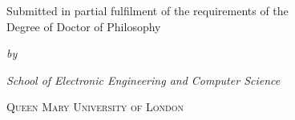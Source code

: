\begin{titlepage}

\begin{center}
\vspace*{\baselineskip}
\vspace{30mm}
\vfill
\noindent {\Huge \textsf{\thetitle}}
\vfill
\vfill
\noindent Submitted in partial fulfilment of the requirements of the\\ Degree of Doctor of Philosophy

\bigskip

\noindent \textit{by}

\bigskip

\noindent {\Large \textsf{\textit{\theauthor}}}
\vfill
\vfill

\noindent \textit{School of Electronic Engineering and Computer Science}

\noindent \textsc{Queen Mary University of London}
\vfill
\vfill
\noindent \textsf{\thedate}
\vspace{10mm}
\vfill
\end{center}

\end{titlepage}